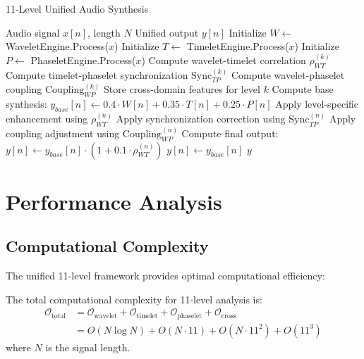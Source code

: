 \begin{algorithm}[H]
\caption{11-Level Unified Audio Synthesis}
\begin{algorithmic}[1]
\REQUIRE Audio signal $x[n]$, length $N$
\ENSURE Unified output $y[n]$
\STATE Initialize $W \leftarrow$ WaveletEngine.Process($x$)
\STATE Initialize $T \leftarrow$ TimeletEngine.Process($x$)
\STATE Initialize $P \leftarrow$ PhaseletEngine.Process($x$)
    \STATE Compute wavelet-timelet correlation $\rho_{WT}^{(k)}$
    \STATE Compute timelet-phaselet synchronization $\text{Sync}_{TP}^{(k)}$
    \STATE Compute wavelet-phaselet coupling $\text{Coupling}_{WP}^{(k)}$
    \STATE Store cross-domain features for level $k$
\ENDFOR
{}
    \STATE Compute base synthesis: $y_{base}[n] \leftarrow 0.4 \cdot W[n] + 0.35 \cdot T[n] + 0.25 \cdot P[n]$
        \STATE Apply level-specific enhancement using $\rho_{WT}^{(n)}$
        \STATE Apply synchronization correction using $\text{Sync}_{TP}^{(n)}$
        \STATE Apply coupling adjustment using $\text{Coupling}_{WP}^{(n)}$
        \STATE Compute final output: $y[n] \leftarrow y_{base}[n] \cdot (1 + 0.1 \cdot \rho_{WT}^{(n)})$
    \ELSE
        \STATE $y[n] \leftarrow y_{base}[n]$
    \ENDIF
\ENDFOR
\RETURN $y$
\end{algorithmic}
\end{algorithm}

\section{Performance Analysis}

\subsection{Computational Complexity}

The unified 11-level framework provides optimal computational efficiency:

\begin{theorem}
The total computational complexity for 11-level analysis is:
\begin{align}
\mathcal{O}_{\text{total}} &= \mathcal{O}_{\text{wavelet}} + \mathcal{O}_{\text{timelet}} + \mathcal{O}_{\text{phaselet}} + \mathcal{O}_{\text{cross}} \\
&= O(N \log N) + O(N \cdot 11) + O(N \cdot 11^2) + O(11^3)
\end{align}
where $N$ is the signal length.
\end{theorem}

